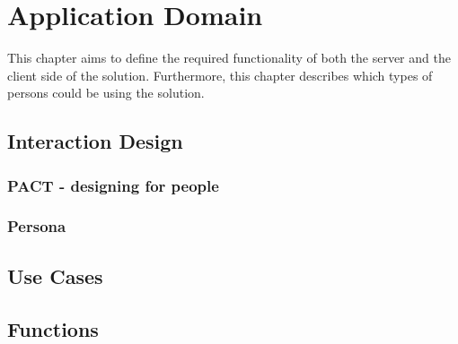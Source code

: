 \chapter{Application Domain}
This chapter aims to define the required functionality of both the server and the client side of the solution. Furthermore, this chapter describes which types of persons could be using the solution. 


\section{Interaction Design}
\subsection{PACT - designing for people}\label{pact}


\subsection{Persona}


\section{Use Cases}\label{usecase}


\section{Functions}

